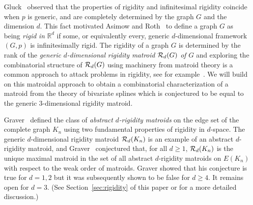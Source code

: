 \documentclass{daj}
\begin{document}
Gluck~\cite{Glu} observed that the properties of rigidity and infinitesimal rigidity   coincide when $p$ is  generic,
and  are completely determined by the graph $G$ and the dimension $d$. This fact motivated Asimow and Roth~\cite{AR78} to define  a graph $G$ as being {\em rigid in $\mathbb{R}^d$} if   some, or equivalently every, generic $d$-dimensional framework $(G,p)$  is infinitesimally rigid.
The rigidity of a graph $G$ is determined by the rank of the {\em generic $d$-dimensional rigidity matroid ${\cal R}_d(G)$ of $G$} and
exploring the combinatorial structure of ${\cal R}_d(G)$ using  machinery from matroid theory is a common approach to attack problems in rigidity, see for example~\cite{TW84,GSS93,Wsurvey}. We  will build on this matroidal approach to obtain a combinatorial characterization of a matroid from the theory of bivariate splines
which is conjectured to be equal to the generic 3-dimensional rigidity matroid.



Graver~\cite{G91} defined  the class of {\em abstract $d$-rigidity matroids} on the edge set of the  complete graph $K_n$ using two fundamental properties of rigidity in $d$-space. The generic $d$-dimensional rigidity matroid ${\cal R}_d(K_n)$  is an example of an abstract $d$-rigidity matroid, and Graver~\cite{G91} conjectured that, for all $d\geq 1$, ${\cal R}_d(K_n)$ is the unique maximal matroid in the set of all abstract $d$-rigidity matroids on $E(K_n)$ with respect to the weak order of matroids. Graver showed that his conjecture is true for $d=1,2$ but it was subsequently shown to be false for $d\geq 4$. It remains open for $d=3$. (See Section~\ref{sec:rigidity} of this paper or \cite{CJT1} for a more detailed discussion.) 
\end{document}
